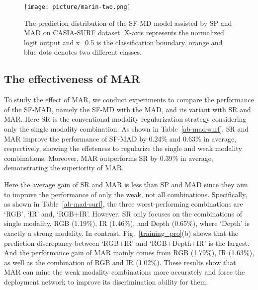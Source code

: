 \documentclass[10pt,twocolumn,letterpaper]{article}
\begin{document}
\begin{figure}[t]
\centering
\texttt{[image: picture/marin-two.png]} \caption{The prediction distribution of the SF-MD model assisted by SP and MAD on CASIA-SURF dataset. X-axis represents the normalized logit output and x=0.5 is the classification boundary. orange and blue dots denotes two different classes.}
\label{MAD_sp_mad}
\vspace{-1.0em}
\end{figure}


\subsection{The effectiveness of MAR} To study the effect of MAR, we conduct experiments to compare the performance of the SF-MAD, namely the SF-MD with the MAD, and its variant with SR and MAR. Here SR is the conventional modality regularization strategy considering only the single modality combination. As shown in Table~\ref{ab-mad-surf}, SR and MAR improve the performance of SF-MAD by 0.24\% and 0.63\% in average, respectively, showing the effeteness to regularize the single and weak modality combinations. Moreover, MAR outperforms SR by 0.39\% in average, demonstrating the superiority of MAR.

Here the average gain of SR and MAR is less than SP and MAD since they aim to improve the performance of only the weak, not all combinations. Specifically, as shown in Table~\ref{ab-mad-surf}, the three worst-performing combinations are `RGB', `IR' and, `RGB+IR'. However, SR only focuses on the combinations of single modality, RGB (1.19\%), IR (1.46\%), and Depth (0.65\%), where `Depth' is exactly a strong modality. In contrast, Fig.~\ref{training_pro}(b) shows that the prediction discrepancy between `RGB+IR' and `RGB+Depth+IR' is the largest. And the performance gain of MAR mainly comes from RGB (1.79\%), IR (1.63\%), as well as the combination of RGB and IR (1.02\%). These results show that MAR can mine the weak modality combinations more accurately and force the deployment network to improve its discrimination ability for them.
\end{document}
